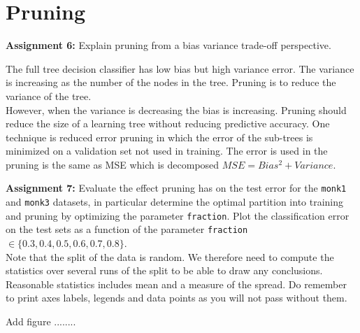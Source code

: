 \documentclass[11pt]{article}
\begin{document}
\section{Pruning}

\begin{tcolorbox}
\textbf{Assignment 6:}
Explain pruning from a bias variance trade-off perspective.
\end{tcolorbox}

The full tree decision classifier has low bias but high variance error. The variance is increasing as the number of the nodes in the tree. Pruning is to reduce the variance of the tree. \\

However, when the variance is decreasing the bias is increasing. Pruning should reduce the size of a learning tree without reducing predictive accuracy. One technique is reduced error pruning in which the error of the sub-trees is minimized on a validation set not used in training. The error is used in the pruning is the same as MSE which is decomposed $MSE = Bias^2 + Variance$.\\

\begin{tcolorbox}
\textbf{Assignment 7:} Evaluate the effect pruning has on the test
error for the \texttt{monk1} and \texttt{monk3} datasets, in
particular determine the optimal partition into training and pruning
by optimizing the parameter \texttt{fraction}.  Plot the
classification error on the test sets as a function of the parameter
\texttt{fraction} $\in \{0.3,0.4,0.5,0.6,0.7,0.8\}$. \\

Note that the split of the data is random. We therefore need to compute 
the statistics over several runs of the split to be able to draw any 
conclusions. Reasonable statistics includes mean and a measure of the spread.
Do remember to print axes labels, legends and data points as you will not pass without them.
\end{tcolorbox}

Add figure ........
\end{document}
